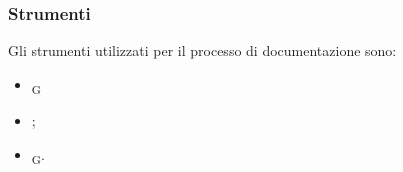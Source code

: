 \subsubsection{Strumenti}
Gli strumenti utilizzati per il processo di documentazione sono:
\begin{itemize}
    \item \textit{}\textsubscript{G}
    \item {};
    \item \textit{}\textsubscript{G}.
\end{itemize}